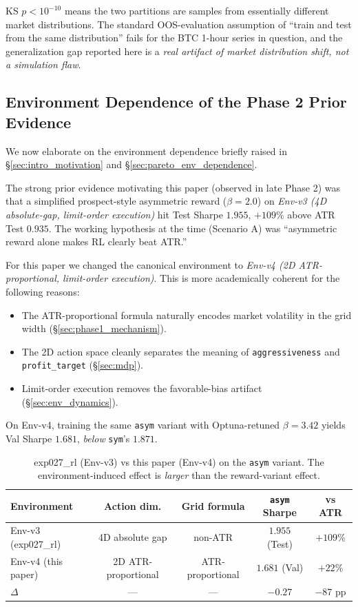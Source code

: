 \documentclass[11pt, a4paper]{article}
\begin{document}
KS $p < 10^{-10}$ means the two partitions are samples from essentially
different market distributions. The standard OOS-evaluation assumption of
``train and test from the same distribution'' fails for the BTC 1-hour
series in question, and the generalization gap reported here is a
\emph{real artifact of market distribution shift, not a simulation flaw}.

\subsection{Environment Dependence of the Phase 2 Prior Evidence}
\label{sec:disc_env_dependence}

We now elaborate on the environment dependence briefly raised in
\S\ref{sec:intro_motivation} and \S\ref{sec:pareto_env_dependence}.

The strong prior evidence motivating this paper (observed in late
Phase 2) was that a simplified prospect-style asymmetric reward
($\beta=2.0$) on \emph{Env-v3 (4D absolute-gap, limit-order execution)} hit
Test Sharpe $1.955$, $+109\%$ above ATR Test $0.935$. The working
hypothesis at the time (Scenario A) was ``asymmetric reward alone makes RL
clearly beat ATR.''

For this paper we changed the canonical environment to \emph{Env-v4 (2D
ATR-proportional, limit-order execution)}. This is more academically
coherent for the following reasons:
\begin{itemize}[leftmargin=*]
\item The ATR-proportional formula naturally encodes market volatility in
the grid width (\S\ref{sec:phase1_mechanism}).
\item The 2D action space cleanly separates the meaning of
\texttt{aggressiveness} and \texttt{profit\_target} (\S\ref{sec:mdp}).
\item Limit-order execution removes the favorable-bias artifact
(\S\ref{sec:env_dynamics}).
\end{itemize}

On Env-v4, training the same \texttt{asym} variant with Optuna-retuned
$\beta=3.42$ yields Val Sharpe $1.681$, \emph{below} \texttt{sym}'s $1.871$.

\begin{table}[!htbp]
\centering
\caption{exp027\_rl (Env-v3) vs this paper (Env-v4) on the \texttt{asym}
variant. The environment-induced effect is \emph{larger} than the
reward-variant effect.}
\begin{tabular}{lcccc}
\toprule
Environment & Action dim. & Grid formula & \texttt{asym} Sharpe & vs ATR \\
\midrule
Env-v3 (exp027\_rl) & 4D absolute gap & non-ATR & $1.955$ (Test) & $+109\%$ \\
Env-v4 (this paper) & 2D ATR-proportional & ATR-proportional & $1.681$ (Val) & $+22\%$ \\
\midrule
$\Delta$ & --- & --- & $-0.27$ & $-87$ pp \\
\bottomrule
\end{tabular}
\label{tab:disc_env_dependence}
\end{table}
\end{document}
